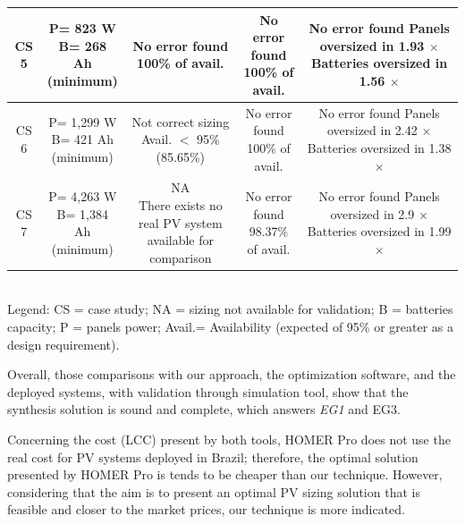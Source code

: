 \documentclass[10pt,journal,compsoc]{IEEEtran}
\begin{document}
\begin{table}
\begin{scriptsize}
\begin{tabular}{c|c|c|c|c}
\hline
CS 5 & \makecell{P= 823 W\\B= 268 Ah\\(minimum)} & \makecell{No error found \\100\% of avail.} & \makecell{No error found \\100\% of avail.} & \makecell{No error found\\Panels oversized in 1.93 $\times$\\Batteries oversized in 1.56 $\times$}\\
\hline
CS 6 & \makecell{P= 1,299 W\\B= 421 Ah\\(minimum)} & \makecell{Not correct sizing \\Avail. $<$ 95\%\\(85.65\%)} & \makecell{No error found \\100\% of avail.} & \makecell{No error found\\Panels oversized in 2.42 $\times$\\Batteries oversized in 1.38 $\times$}\\
\hline
CS 7 & \makecell{P= 4,263 W\\B= 1,384 Ah\\(minimum)} & \makecell{NA\\There exists no real PV system\\available for comparison} & \makecell{No error found \\98.37\% of avail.} & \makecell{No error found\\Panels oversized in 2.9 $\times$\\Batteries oversized in 1.99 $\times$}\\
\hline
\hline
\end{tabular}
\\Legend: CS = case study; NA = sizing not available for validation; B = batteries capacity; P = panels power; Avail.= Availability (expected of 95\% or greater as a design requirement).
\end{scriptsize}
\end{table}

Overall, those comparisons with our approach, the optimization software, and the deployed systems, with validation through simulation tool, show that the synthesis solution is sound and complete, which answers \textit{EG1} and {EG3}.

  Concerning the cost (LCC) present by both tools, HOMER Pro does not use the real cost for PV systems deployed in Brazil; therefore, the optimal solution presented by HOMER Pro is tends to be cheaper than our technique. However, considering that the aim is to present an optimal PV sizing solution that is feasible and closer to the market prices, our technique is more indicated. \color{black}
\end{document}

